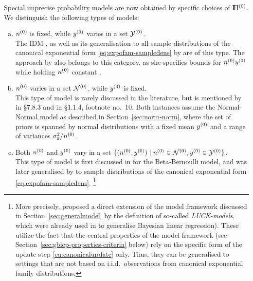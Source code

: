 Special imprecise probability models are now obtained by specific choices of $\text{I}\!\Pi^{(0)}$.
We distinguish the following types of models:
\begin{enumerate}[(a)]
\item $n^{(0)}$ is fixed, while $y^{(0)}$ varies in a set $\mathcal{Y}^{(0)}$.\\
\label{enum:modeltypes-a}%
The IDM \parencite{1996:walley::idm},
as well as its generalisation to all sample distributions of the canonical exponential form \eqref{eq:expofam-sampledens}
by \textcite{2005:quaeghebeurcooman} are of this type.
The approach by \textcite{1997:boratynska} also belongs to this category,
as she specifies bounds for $n^{(0)} y^{(0)}$ while holding $n^{(0)}$ constant \parencite[see][p.~1973]{2012:benavolizaffalon}.
\item $n^{(0)}$ varies in a set $\mathcal{N}^{(0)}$, while $y^{(0)}$ is fixed.\\
\label{enum:varyn}%
This type of model is rarely discussed in the literature,
but is mentioned by \textcite{1991:walley} in {\S 7.8.3} and in {\S 1.1.4}, footnote no.~10.
Both instances assume the Normal-Normal model as described in Section~\ref{sec:norm-norm},
where the set of priors is spanned by normal distributions with a fixed mean $y^{(0)}$ and a range of variances $\sigma_0^2 / n^{(0)}$.
\item Both $n^{(0)}$ and $y^{(0)}$ vary in a set $\{ (n^{(0)}, y^{(0)}) \mid n^{(0)} \in \mathcal{N}^{(0)}, y^{(0)} \in \mathcal{Y}^{(0)} \}$.\\
\label{enum:rectangular}%
This type of model is first discussed in \textcite[\S 5.4.3]{1991:walley} for the Beta-Bernoulli model,
and was later generalised by \textcite{Walter2009a}
to sample distributions of the canonical exponential form \eqref{eq:expofam-sampledens}.%
\footnote{\label{foot:luckmodels}%
More precisely, \textcite[see Section~\ref{sec:jstp}]{Walter2009a} proposed
a direct extension of the model framework discussed in Section~\ref{sec:generalmodel}
by the definition of so-called \emph{LUCK-models},
which were already used in \textcite{Walter2007a}
to generalise Bayesian linear regression). %
These utilize the fact that the central properties of the model framework
(see Section~\ref{sec:gbicp-properties-criteria} below)
rely on the specific form of the update step \eqref{eq:canonicalupdate} only.
Thus, they can be generalised to settings that are not based on i.i.d.\ observations from canonical exponential family distributions,
}
\end{enumerate}
